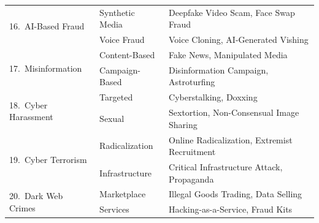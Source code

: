 \documentclass[10pt,a4paper]{article}
\begin{document}
\begin{longtable}{|l|l|p{7cm}|}
\multirow{2}{*}{16.\ AI-Based Fraud}
  & Synthetic Media     & Deepfake Video Scam, Face Swap Fraud \\
  & Voice Fraud         & Voice Cloning, AI-Generated Vishing \\
\hline

\multirow{2}{*}{17.\ Misinformation}
  & Content-Based       & Fake News, Manipulated Media \\
  & Campaign-Based      & Disinformation Campaign, Astroturfing \\
\hline

\multirow{2}{*}{18.\ Cyber Harassment}
  & Targeted            & Cyberstalking, Doxxing \\
  & Sexual              & Sextortion, Non-Consensual Image Sharing \\
\hline

\multirow{2}{*}{19.\ Cyber Terrorism}
  & Radicalization      & Online Radicalization, Extremist Recruitment \\
  & Infrastructure      & Critical Infrastructure Attack, Propaganda \\
\hline

\multirow{2}{*}{20.\ Dark Web Crimes}
  & Marketplace         & Illegal Goods Trading, Data Selling \\
  & Services            & Hacking-as-a-Service, Fraud Kits \\
\hline

\end{longtable}
\end{document}

